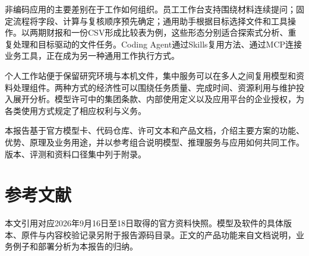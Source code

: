 \documentclass[11pt,a4paper,fontset=none]{ctexart}
\begin{document}
非编码应用的主要差别在于工作如何组织。员工工作台支持围绕材料连续提问；固定流程将字段、计算与复核顺序预先确定；通用助手根据目标选择文件和工具操作。以两期财报和一份CSV形成比较表为例，这些形态分别适合探索式分析、重复处理和目标驱动的文件任务。Coding Agent通过Skills复用方法、通过MCP连接业务工具，正在成为另一种通用工作执行方式。

个人工作站便于保留研究环境与本机文件，集中服务可以在多人之间复用模型和资料处理组件。两种方式的经济性可以围绕任务质量、完成时间、资源利用与维护投入展开分析。模型许可中的集团条款、内部使用定义以及应用平台的企业授权，为各类使用方式规定了相应权利与义务。

本报告基于官方模型卡、代码仓库、许可文本和产品文档，介绍主要方案的功能、优势、原理及业务用途，并以参考组合说明模型、推理服务与应用如何共同工作。版本、评测和资料口径集中列于附录。
\clearpage
\tableofcontents
\clearpage






\clearpage
\appendix

\clearpage
\section{参考文献}
本文引用对应2026年9月16日至18日取得的官方资料快照。模型及软件的具体版本、原件与内容校验记录另附于报告源码目录。正文的产品功能来自文档说明，业务例子和部署分析为本报告的归纳。

\end{document}

